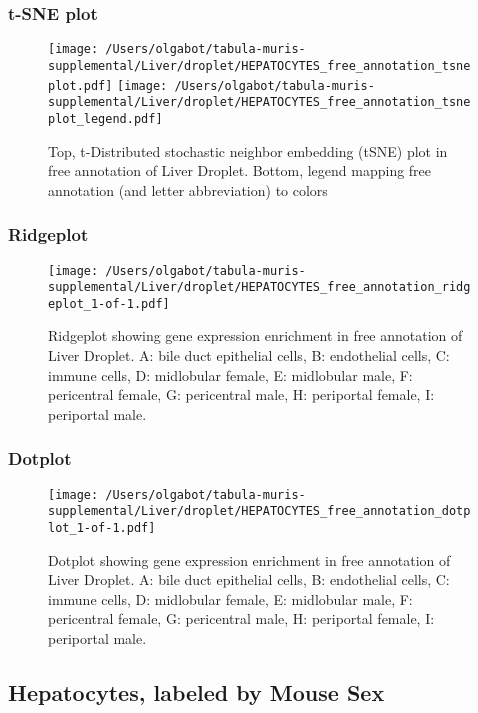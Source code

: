 \newpage
\subsubsection{t-SNE plot}
\begin{figure}[h]
\centering
\texttt{[image: /Users/olgabot/tabula-muris-supplemental/Liver/droplet/HEPATOCYTES\_free\_annotation\_tsneplot.pdf]}
\texttt{[image: /Users/olgabot/tabula-muris-supplemental/Liver/droplet/HEPATOCYTES\_free\_annotation\_tsneplot\_legend.pdf]}
\caption{Top, t-Distributed stochastic neighbor embedding (tSNE) plot  in free annotation of Liver Droplet. Bottom, legend mapping free annotation (and letter abbreviation) to colors}
\end{figure}


\newpage
\newpage
\subsubsection{Ridgeplot}
\begin{figure}[h]
\centering
\texttt{[image: /Users/olgabot/tabula-muris-supplemental/Liver/droplet/HEPATOCYTES\_free\_annotation\_ridgeplot\_1-of-1.pdf]}

\caption{ Ridgeplot  showing gene expression enrichment in free annotation of Liver Droplet. A: bile duct epithelial cells, B: endothelial cells, C: immune cells, D: midlobular female, E: midlobular male, F: pericentral female, G: pericentral male, H: periportal female, I: periportal male.}
\end{figure}


\newpage
\newpage
\subsubsection{Dotplot}
\begin{figure}[h]
\centering
\texttt{[image: /Users/olgabot/tabula-muris-supplemental/Liver/droplet/HEPATOCYTES\_free\_annotation\_dotplot\_1-of-1.pdf]}

\caption{ Dotplot  showing gene expression enrichment in free annotation of Liver Droplet. A: bile duct epithelial cells, B: endothelial cells, C: immune cells, D: midlobular female, E: midlobular male, F: pericentral female, G: pericentral male, H: periportal female, I: periportal male.}
\end{figure}


\newpage
\subsection{Hepatocytes, labeled by Mouse Sex}
